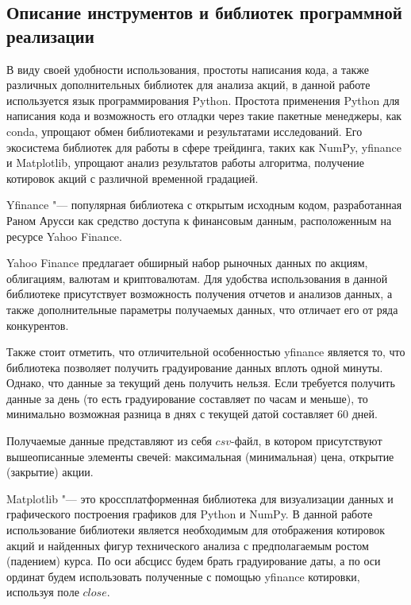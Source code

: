 \documentclass[bachelor, och, coursework]{SCWorks}
\begin{document}
    \subsection{Описание инструментов и библиотек программной реализации}

        В виду своей удобности использования, простоты написания кода, а также
        различных дополнительных библиотек для анализа акций, в данной работе
        используется язык программирования Python. Простота применения Python
        для написания кода и возможность его отладки через такие пакетные
        менеджеры, как conda, упрощают обмен библиотеками и результатами
        исследований. Его экосистема библиотек для работы в сфере трейдинга,
        таких как NumPy, yfinance и Matplotlib, упрощают анализ результатов
        работы алгоритма, получение котировок акций с различной временной
        градацией.

        Yfinance "--- популярная библиотека с открытым исходным кодом,
        разработанная Раном Арусси как средство доступа к финансовым данным,
        расположенным на ресурсе Yahoo Finance.

        Yahoo Finance предлагает обширный набор рыночных данных по акциям,
        облигациям, валютам и криптовалютам. Для удобства использования в данной
        библиотеке присутствует возможность получения отчетов и анализов данных,
        а также дополнительные параметры получаемых данных, что отличает его от
        ряда конкурентов.

        Также стоит отметить, что отличительной особенностью yfinance является
        то, что библиотека позволяет получить градуирование данных вплоть одной
        минуты. Однако, что данные за текущий день получить нельзя. Если
        требуется получить данные за день (то есть градуирование составляет по
        часам и меньше), то минимально возможная разница в днях с текущей датой
        составляет 60 дней.

        Получаемые данные представляют из себя $csv$-файл, в котором
        присутствуют вышеописанные элементы свечей: максимальная (минимальная)
        цена, открытие (закрытие) акции.

        
        Matplotlib "--- это кроссплатформенная библиотека для визуализации
        данных и графического построения графиков для Python и NumPy. В данной
        работе использование библиотеки является необходимым для отображения
        котировок акций и найденных фигур технического анализа с предполагаемым
        ростом (падением) курса. По оси абсцисс будем брать градуирование даты,
        а по оси ординат будем использовать полученные с помощью yfinance
        котировки, используя поле $close$.
\end{document}
